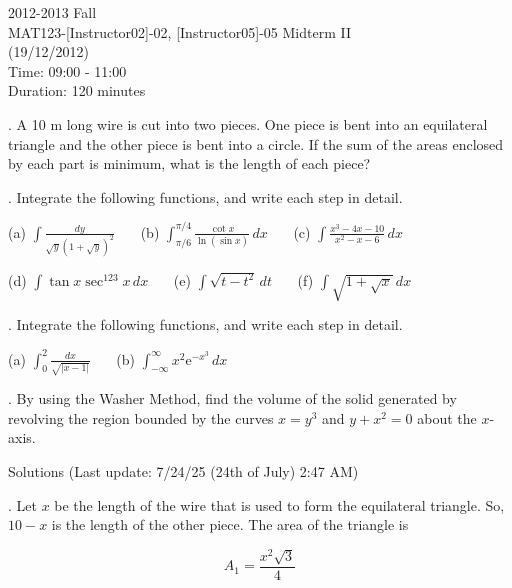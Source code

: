 \documentclass{article}
\begin{document}
\large

\begin{center}
2012-2013 Fall \\MAT123-[Instructor02]-02, [Instructor05]-05 Midterm II\\(19/12/2012)\\Time: 09:00 - 11:00\\Duration: 120 minutes
\end{center}

. A 10 m long wire is cut into two pieces. One piece is bent into an equilateral triangle and the other piece is bent into a circle. If the sum of the areas enclosed by each part is minimum, what is the length of each piece?

\hfill

. Integrate the following functions, and write each step in detail.

\hfill

(a) $\displaystyle\int\frac{dy}{\sqrt{y}\left(1+\sqrt y\right)^2}$ \ \ \ (b) $\displaystyle\int_{\pi/6}^{\pi/4}\frac{\cot x}{\ln(\sin x)}\,dx$ \ \ \ (c) $\displaystyle\int\frac{x^3-4x-10}{x^2-x-6}\,dx$

\hfill

(d) $\displaystyle \int\tan x \sec^{123}x\,dx$ \ \ \ (e) $\displaystyle\int\sqrt{t-t^2}\,dt$ \ \ \ (f) $\displaystyle\int\sqrt{1+\sqrt x}\,dx$

\hfill

. Integrate the following functions, and write each step in detail.

\hfill

(a) $\displaystyle \int_0^2\frac{dx}{\sqrt{|x-1|}}$ \ \ \ (b) $\displaystyle\int_{-\infty}^{\infty}x^2\mathrm{e}^{-x^3}\,dx$

\hfill

. By using the Washer Method, find the volume of the solid generated by revolving the region bounded by the curves $x=y^3$ and $y+x^2=0$ about the $x$-axis.

\newpage

\begin{center}
Solutions (Last update: 7/24/25 (24th of July) 2:47 AM)
\end{center}

. Let $x$ be the length of the wire that is used to form the equilateral triangle. So, $10-x$ is the length of the other piece. The area of the triangle is

\begin{equation*}
A_1 = \frac{x^2\sqrt3}{4}
\end{equation*}
\end{document}
